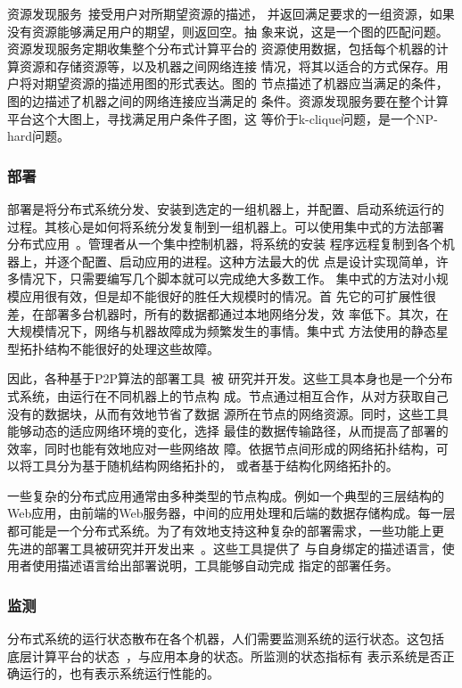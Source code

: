 资源发现服务~\cite{sword_toit, xenosearch}接受用户对所期望资源的描述，
并返回满足要求的一组资源，如果没有资源能够满足用户的期望，则返回空。抽
象来说，这是一个图的匹配问题。资源发现服务定期收集整个分布式计算平台的
资源使用数据，包括每个机器的计算资源和存储资源等，以及机器之间网络连接
情况，将其以适合的方式保存。用户将对期望资源的描述用图的形式表达。图的
节点描述了机器应当满足的条件，图的边描述了机器之间的网络连接应当满足的
条件。资源发现服务要在整个计算平台这个大图上，寻找满足用户条件子图，这
等价于k-clique问题，是一个NP-hard问题。

\subsubsection*{部署}

部署是将分布式系统分发、安装到选定的一组机器上，并配置、启动系统运行的
过程。其核心是如何将系统分发复制到一组机器上。可以使用集中式的方法部署
分布式应用~\cite{vxargs, pssh}。管理者从一个集中控制机器，将系统的安装
程序远程复制到各个机器上，并逐个配置、启动应用的进程。这种方法最大的优
点是设计实现简单，许多情况下，只需要编写几个脚本就可以完成绝大多数工作。
集中式的方法对小规模应用很有效，但是却不能很好的胜任大规模时的情况。首
先它的可扩展性很差，在部署多台机器时，所有的数据都通过本地网络分发，效
率低下。其次，在大规模情况下，网络与机器故障成为频繁发生的事情。集中式
方法使用的静态星型拓扑结构不能很好的处理这些故障。

因此，各种基于P2P算法的部署工具~\cite{bittorrent, codeploy, sharkfs}被
研究并开发。这些工具本身也是一个分布式系统，由运行在不同机器上的节点构
成。节点通过相互合作，从对方获取自己没有的数据块，从而有效地节省了数据
源所在节点的网络资源。同时，这些工具能够动态的适应网络环境的变化，选择
最佳的数据传输路径，从而提高了部署的效率，同时也能有效地应对一些网络故
障。依据节点间形成的网络拓扑结构，可以将工具分为基于随机结构网络拓扑的，
或者基于结构化网络拓扑的。

一些复杂的分布式应用通常由多种类型的节点构成。例如一个典型的三层结构的
Web应用，由前端的Web服务器，中间的应用处理和后端的数据存储构成。每一层
都可能是一个分布式系统。为了有效地支持这种复杂的部署需求，一些功能上更
先进的部署工具被研究并开发出来~\cite{plush, smartfrog}。这些工具提供了
与自身绑定的描述语言，使用者使用描述语言给出部署说明，工具能够自动完成
指定的部署任务。

\subsubsection*{监测}

分布式系统的运行状态散布在各个机器，人们需要监测系统的运行状态。这包括
底层计算平台的状态~\cite{comon}，与应用本身的状态。所监测的状态指标有
表示系统是否正确运行的，也有表示系统运行性能的。

